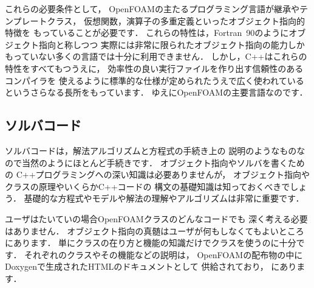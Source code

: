 これらの必要条件として，
OpenFOAMの主たるプログラミング言語が継承やテンプレートクラス，
仮想関数，演算子の多重定義といったオブジェクト指向的特徴を
もっていることが必要です．
これらの特性は，Fortran~90のようにオブジェクト指向と称しつつ
実際には非常に限られたオブジェクト指向の能力しか
もっていない多くの言語では十分に利用できません．
しかし，C++はこれらの特性をすべてもつうえに，
効率性の良い実行ファイルを作り出す信頼性のあるコンパイラを
使えるように標準的な仕様が定められたうえで広く使われている
というさらなる長所をもっています．
ゆえにOpenFOAMの主要言語なのです．


\subsection{ソルバコード}
\label{ssec:3.1.4}
ソルバコードは，解法アルゴリズムと方程式の手続き上の
説明のようなものなので当然のようにほとんど手続きです．
オブジェクト指向やソルバを書くための
C++プログラミングへの深い知識は必要ありませんが，
オブジェクト指向やクラスの原理やいくらかC++コードの
構文の基礎知識は知っておくべきでしょう．
基礎的な方程式やモデルや解法の理解やアルゴリズムは非常に重要です．

ユーザはたいていの場合OpenFOAMクラスのどんなコードでも
深く考える必要はありません．
オブジェクト指向の真髄はユーザが何もしなくてもよいところにあります．
単にクラスの在り方と機能の知識だけでクラスを使うのに十分です．
それぞれのクラスやその機能などの説明は，
OpenFOAMの配布物の中にDoxygenで生成されたHTMLのドキュメントとして
供給されており，
にあります．



